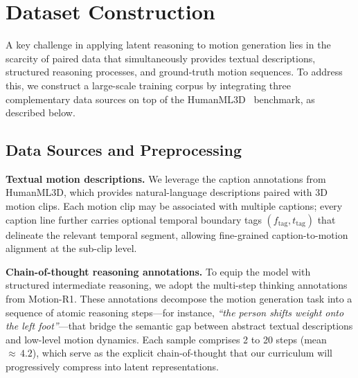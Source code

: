 %

\section{Dataset Construction}
\label{sec:dataset}

A key challenge in applying latent reasoning to motion generation lies in
the scarcity of paired data that simultaneously provides textual
descriptions, structured reasoning processes, and ground-truth motion
sequences.
To address this, we construct a large-scale training corpus by integrating
three complementary data sources on top of the
HumanML3D~\cite{guo2022generating} benchmark, as described below.

\subsection{Data Sources and Preprocessing}
\label{sec:data_sources}

\noindent\textbf{Textual motion descriptions.}
We leverage the caption annotations from HumanML3D, which provides
natural-language descriptions paired with 3D motion clips.
Each motion clip may be associated with multiple captions; every caption
line further carries optional temporal boundary tags
$(f_{\mathrm{tag}}, t_{\mathrm{tag}})$ that delineate the relevant
temporal segment, allowing fine-grained caption-to-motion alignment at
the sub-clip level.

\noindent\textbf{Chain-of-thought reasoning annotations.}
To equip the model with structured intermediate reasoning, we adopt the
multi-step thinking annotations from Motion-R1\@.
These annotations decompose the motion generation task into a sequence of
atomic reasoning steps---for instance, \emph{``the person shifts weight
onto the left foot''}---that bridge the semantic gap between abstract
textual descriptions and low-level motion dynamics.
Each sample comprises 2 to 20 steps (mean ${\approx}\,4.2$), which serve
as the explicit chain-of-thought that our curriculum will progressively
compress into latent representations.

